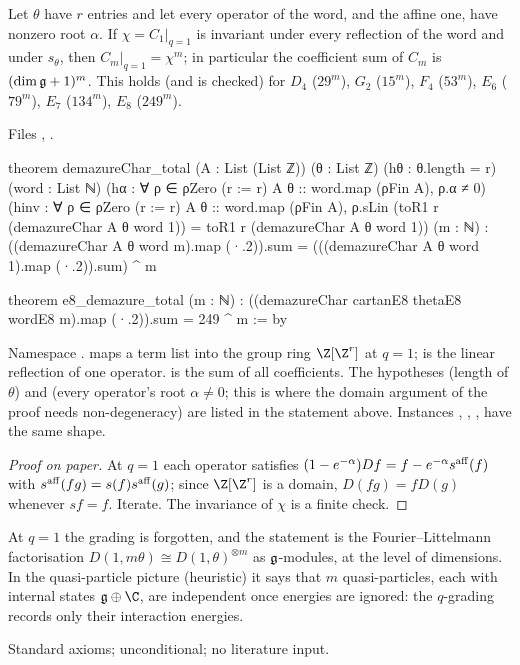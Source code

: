 \begin{theorem}[Tensor factorisation at $q=1$]\label{l25:thm:total}
Let $\theta$ have $r$ entries and let every operator of the word, and the affine one, have nonzero root $\alpha$. If
$\chi=C_1|_{q=1}$ is invariant under every reflection of the word and under $s_\theta$, then
$C_m|_{q=1}=\chi^m$; in particular the coefficient sum of $C_m$ is $(\dim\mathfrak g+1)^m$. This holds (and is checked)
for $D_4$ ($29^m$), $G_2$ ($15^m$), $F_4$ ($53^m$), $E_6$ ($79^m$), $E_7$ ($134^m$), $E_8$ ($249^m$).
\end{theorem}
\noindent Files ,
.
\begin{leancode}
theorem demazureChar_total (A : List (List ℤ)) (θ : List ℤ) (hθ : θ.length = r)
    (word : List ℕ)
    (hα : ∀ ρ ∈ ρZero (r := r) A θ :: word.map (ρFin A), ρ.α ≠ 0)
    (hinv : ∀ ρ ∈ ρZero (r := r) A θ :: word.map (ρFin A),
      ρ.sLin (toR1 r (demazureChar A θ word 1)) = toR1 r (demazureChar A θ word 1)) (m : ℕ) :
    ((demazureChar A θ word m).map (·.2)).sum = (((demazureChar A θ word 1).map (·.2)).sum) ^ m

theorem e8_demazure_total (m : ℕ) :
    ((demazureChar cartanE8 thetaE8 wordE8 m).map (·.2)).sum = 249 ^ m := by
\end{leancode}
\begin{dictionary}
Namespace .  maps a term list into the group ring
$\Z[\Z^r]$ at $q=1$;  is the linear reflection of one operator.  is the sum of all
coefficients. The hypotheses  (length of $\theta$) and  (every operator's root $\alpha\ne0$; this is
where the domain argument of the proof needs non-degeneracy) are listed in the statement above. Instances , , ,
 have the same shape.
\end{dictionary}
\begin{proof}[Proof on paper]
At $q=1$ each operator satisfies $(1-e^{-\alpha})Df=f-e^{-\alpha}s^{\rm aff}(f)$ with $s^{\rm aff}(fg)=s(f)s^{\rm aff}(g)$; since
$\Z[\Z^r]$ is a domain, $D(fg)=fD(g)$ whenever $sf=f$. Iterate. The invariance of $\chi$ is a finite check.
\end{proof}
\begin{physics}
At $q=1$ the grading is forgotten, and the statement is the Fourier--Littelmann factorisation
$D(1,m\theta)\cong D(1,\theta)^{\otimes m}$ as $\mathfrak g$-modules, at the level of dimensions. In the quasi-particle
picture (heuristic) it says that $m$ quasi-particles, each with internal states $\ltwentyfiveg\oplus\C$, are
independent once energies are ignored: the $q$-grading records only their interaction energies.
\end{physics}
\begin{status}
Standard axioms; unconditional; no literature input.
\end{status}

